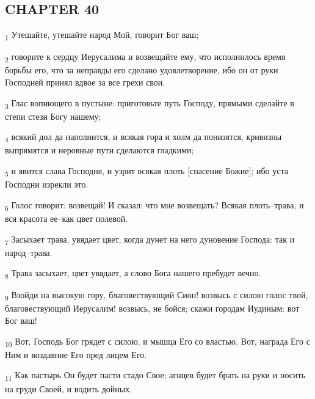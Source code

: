 \subsection{CHAPTER 40}
\begin{tcolorbox}
\textsubscript{1} Утешайте, утешайте народ Мой, говорит Бог ваш;
\end{tcolorbox}
\begin{tcolorbox}
\textsubscript{2} говорите к сердцу Иерусалима и возвещайте ему, что исполнилось время борьбы его, что за неправды его сделано удовлетворение, ибо он от руки Господней принял вдвое за все грехи свои.
\end{tcolorbox}
\begin{tcolorbox}
\textsubscript{3} Глас вопиющего в пустыне: приготовьте путь Господу, прямыми сделайте в степи стези Богу нашему;
\end{tcolorbox}
\begin{tcolorbox}
\textsubscript{4} всякий дол да наполнится, и всякая гора и холм да понизятся, кривизны выпрямятся и неровные пути сделаются гладкими;
\end{tcolorbox}
\begin{tcolorbox}
\textsubscript{5} и явится слава Господня, и узрит всякая плоть [спасение Божие]; ибо уста Господни изрекли это.
\end{tcolorbox}
\begin{tcolorbox}
\textsubscript{6} Голос говорит: возвещай! И сказал: что мне возвещать? Всякая плоть--трава, и вся красота ее--как цвет полевой.
\end{tcolorbox}
\begin{tcolorbox}
\textsubscript{7} Засыхает трава, увядает цвет, когда дунет на него дуновение Господа: так и народ--трава.
\end{tcolorbox}
\begin{tcolorbox}
\textsubscript{8} Трава засыхает, цвет увядает, а слово Бога нашего пребудет вечно.
\end{tcolorbox}
\begin{tcolorbox}
\textsubscript{9} Взойди на высокую гору, благовествующий Сион! возвысь с силою голос твой, благовествующий Иерусалим! возвысь, не бойся; скажи городам Иудиным: вот Бог ваш!
\end{tcolorbox}
\begin{tcolorbox}
\textsubscript{10} Вот, Господь Бог грядет с силою, и мышца Его со властью. Вот, награда Его с Ним и воздаяние Его пред лицем Его.
\end{tcolorbox}
\begin{tcolorbox}
\textsubscript{11} Как пастырь Он будет пасти стадо Свое; агнцев будет брать на руки и носить на груди Своей, и водить дойных.
\end{tcolorbox}
